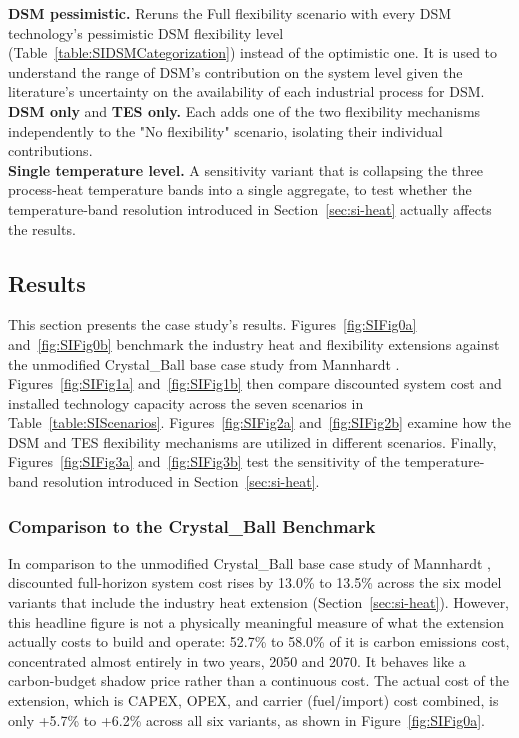 \textbf{DSM pessimistic.} Reruns the Full flexibility scenario with every DSM technology's pessimistic DSM flexibility level (Table~\ref{table:SIDSMCategorization}) instead of the optimistic one. It is used to understand the range of DSM's contribution on the system level given the literature's uncertainty on the availability of each industrial process for DSM. \\

\textbf{DSM only} and \textbf{TES only.} Each adds one of the two flexibility mechanisms independently to the "No flexibility" scenario, isolating their individual contributions. \\

\textbf{Single temperature level.} A sensitivity variant that is collapsing the three process-heat temperature bands into a single aggregate, to test whether the temperature-band resolution introduced in Section~\ref{sec:si-heat} actually affects the results.

\subsection{Results}
\label{sec:si-results}


This section presents the case study's results. Figures~\ref{fig:SIFig0a} and~\ref{fig:SIFig0b} benchmark the industry heat and flexibility extensions against the unmodified Crystal\_Ball base case study from Mannhardt \cite{Mannhardt2026}. Figures~\ref{fig:SIFig1a} and~\ref{fig:SIFig1b} then compare discounted system cost and installed technology capacity across the seven scenarios in Table~\ref{table:SIScenarios}. Figures~\ref{fig:SIFig2a} and~\ref{fig:SIFig2b} examine how the DSM and TES flexibility mechanisms are utilized in different scenarios. Finally, Figures~\ref{fig:SIFig3a} and~\ref{fig:SIFig3b} test the sensitivity of the temperature-band resolution introduced in Section~\ref{sec:si-heat}.

\subsubsection{Comparison to the Crystal\_Ball Benchmark}
\label{sec:si-benchmark}

In comparison to the unmodified Crystal\_Ball base case study of Mannhardt \cite{Mannhardt2026}, discounted full-horizon system cost rises by 13.0\% to 13.5\% across the six model variants that include the industry heat extension (Section~\ref{sec:si-heat}). However, this headline figure is not a physically meaningful measure of what the extension actually costs to build and operate: 52.7\% to 58.0\% of it is carbon emissions cost, concentrated almost entirely in two years, 2050 and 2070. It behaves like a carbon-budget shadow price rather than a continuous cost. The actual cost of the extension, which is CAPEX, OPEX, and carrier (fuel/import) cost combined, is only +5.7\% to +6.2\% across all six variants, as shown in Figure~\ref{fig:SIFig0a}.


